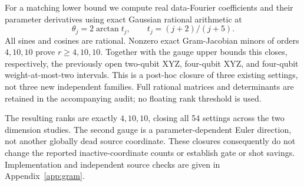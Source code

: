 For a matching lower bound we compute real data-Fourier coefficients
and their parameter derivatives using exact Gaussian rational
arithmetic at
\begin{equation}
 \theta_j=2\arctan t_j,\qquad t_j=(j+2)/(j+5).
\end{equation}
All sines and cosines are rational. Nonzero exact Gram-Jacobian minors
of orders $4,10,10$ prove $r\ge4,10,10$. Together with the gauge upper
bounds this closes, respectively, the previously open two-qubit XYZ,
four-qubit XYZ, and four-qubit weight-at-most-two intervals.
This is a post-hoc closure of three existing settings, not three new
independent families. Full rational matrices and determinants are
retained in the accompanying audit; no floating rank threshold is used.

The resulting ranks are exactly $4,10,10$, closing all 54 settings
across the two dimension studies. The second gauge is a
parameter-dependent Euler direction, not another globally dead
source coordinate. These closures consequently do not change the
reported inactive-coordinate counts or establish gate or shot savings.
Implementation and independent source checks are given in
Appendix~\ref{app:gram}.
